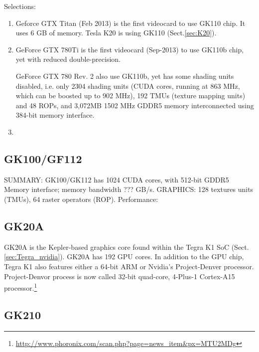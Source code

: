 Selections:
\begin{enumerate}
  
  \item Geforce GTX Titan (Feb 2013) is the first videocard to use GK110 chip.
  It uses 6 GB of memory. Tesla K20 is using GK110 (Sect.\ref{sec:K20}).

  \item GeForce GTX 780Ti is the first videocard (Sep-2013) to use GK110b chip,
  yet with reduced double-precision.
  
GeForce GTX 780 Rev. 2 also use GK110b, yet has some shading units disabled,
i.e. only 2304 shading units (CUDA cores, running at 863 MHz, which can be
boosted up to 902 MHz), 192 TMUs (texture mapping units) and 48 ROPs, and
3,072MB 1502 MHz GDDR5 memory interconnected using 384-bit memory interface.

  \item 
\end{enumerate}


\subsection{GK100/GF112}

SUMMARY: GK100/GK112 has 1024 CUDA cores, with 512-bit GDDR5 Memory interface;
memory bandwidth ??? GB/s. GRAPHICS: 128 textures units (TMUs), 64 raster operators
(ROP). Performance:

\subsection{GK20A}
\label{sec:GK20A}

GK20A is the Kepler-based graphics core found within the Tegra K1 SoC
(Sect.\ref{sec:Tegra_nvidia}). GK20A has 192 GPU cores. In addition to the GPU
chip, Tegra K1 also features either a 64-bit ARM or Nvidia's Project-Denver
processor. Project-Denvor process is now called 32-bit quad-core, 4-Plus-1
Cortex-A15
processor.\footnote{\url{http://www.phoronix.com/scan.php?page=news_item&px=MTU2MDg}}

\subsection{GK210}
\label{sec:GK210}

